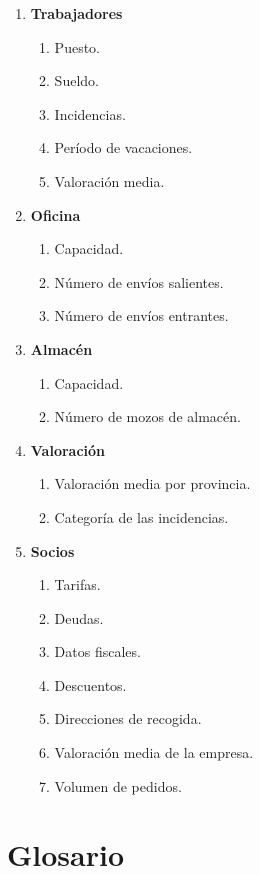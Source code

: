 \documentclass[12pt,spanish]{article}
\begin{document}
\begin{enumerate}[label=\textbf{RI-\arabic*}]
	\item \textbf{Trabajadores}
	\begin{enumerate}[label=\textbf{RI-3.\arabic*}]
		\item Puesto.
		\item Sueldo.
		\item Incidencias.
		\item Período de vacaciones.
		\item Valoración media.
	\end{enumerate}	
	\item \textbf{Oficina}
	\begin{enumerate}[label=\textbf{RI-4.\arabic*}]
		\item Capacidad.
		\item Número de envíos salientes.
		\item Número de envíos entrantes.
	\end{enumerate}		
	\item \textbf{Almacén}
		\begin{enumerate}[label=\textbf{RI-5.\arabic*}]
			\item Capacidad.
			\item Número de mozos de almacén.
		\end{enumerate}	
	\item \textbf{Valoración}
		\begin{enumerate}[label=\textbf{RI-6.\arabic*}]
			\item Valoración media por provincia.
			\item Categoría de las incidencias.
		\end{enumerate}	
	\item \textbf{Socios}
			\begin{enumerate}[label=\textbf{RI-7.\arabic*}]
			\item Tarifas.
			\item Deudas.
			\item Datos fiscales.
			\item Descuentos.
			\item Direcciones de recogida.
			\item Valoración media de la empresa.
			\item Volumen de pedidos.
		\end{enumerate}	
\end{enumerate}

\section{Glosario}
\end{document}
